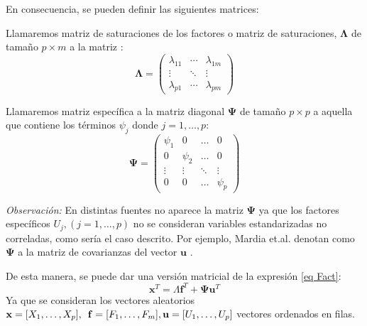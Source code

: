 \noindent En consecuencia, se pueden definir las siguientes matrices: 

\begin{defi}
Llamaremos matriz de saturaciones de los factores o matriz de saturaciones, $\mathbf{\Lambda}$ de tamaño $p \times m$ a la matriz :
\begin{equation}
\mathbf{\Lambda}=\begin{pmatrix}
\lambda_{11} & \cdots & \lambda_{1 m}\\
\vdots & \ddots & \vdots\\
\lambda_{p1} & \cdots & \lambda_{pm}
\end{pmatrix}
\end{equation}
\end{defi}

\begin{defi}
Llamaremos matriz específica a la matriz diagonal $\mathbf{\Psi}$ de tamaño $p\times p$ a aquella que contiene los términos $\psi_j$ donde $j=1,\ldots , p$:
\begin{equation}
\mathbf{\Psi}=\begin{pmatrix}
    \psi_1 & 0 & \dots & 0 \\
    0 & \psi_2 & \dots & 0 \\
    \vdots & \vdots & \ddots & \vdots \\
    0 & 0 & \dots & \psi_p
\end{pmatrix}
\end{equation}
\end{defi}

\noindent \emph{Observación:} En distintas fuentes no aparece la matriz $\mathbf{\Psi}$ ya que los factores específicos $U_j, (j=1,\ldots,p)$ no se consideran variables estandarizadas no correladas, como sería el caso descrito. Por ejemplo, Mardia et.al. denotan como $\mathbf{\Psi}$ a la matriz de covarianzas del vector $\mathbf{u}$ \cite{Mardia 1979}.

\noindent De esta manera, se puede dar una versión matricial de la expresión \ref{eq Fact}:
\begin{equation}
\mathbf{x}^T=\Lambda \mathbf{f}^T+ \mathbf{\Psi}\mathbf{u}^T
\end{equation}
Ya que se consideran los vectores aleatorios $\mathbf{x}=[X_1,\ldots,X_p], \enspace\mathbf{f}=[F_1,\ldots,F_m], \\\mathbf{u}=[U_1, \ldots, U_p]$ vectores ordenados en filas. 

